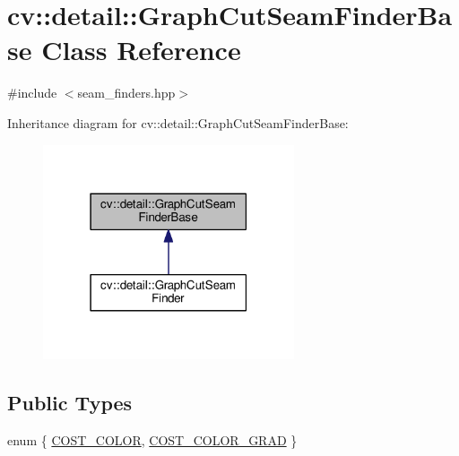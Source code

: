 \hypertarget{classcv_1_1detail_1_1GraphCutSeamFinderBase}{\section{cv\-:\-:detail\-:\-:Graph\-Cut\-Seam\-Finder\-Base Class Reference}
\label{classcv_1_1detail_1_1GraphCutSeamFinderBase}
}


{\ttfamily \#include $<$seam\-\_\-finders.\-hpp$>$}



Inheritance diagram for cv\-:\-:detail\-:\-:Graph\-Cut\-Seam\-Finder\-Base\-:\nopagebreak
\begin{figure}[H]
\begin{center}
\leavevmode
\includegraphics[width=210pt]{classcv_1_1detail_1_1GraphCutSeamFinderBase__inherit__graph}
\end{center}
\end{figure}
\subsection*{Public Types}
\begin{DoxyCompactItemize}
\item 
enum \{ \hyperlink{classcv_1_1detail_1_1GraphCutSeamFinderBase_a322bf4a47a9cc71cfdd8ff65971f07c3afe0d275582723d93a0c576584ea90091}{C\-O\-S\-T\-\_\-\-C\-O\-L\-O\-R}, 
\hyperlink{classcv_1_1detail_1_1GraphCutSeamFinderBase_a322bf4a47a9cc71cfdd8ff65971f07c3a4e0af02eed7c3f02976244dc832e0e81}{C\-O\-S\-T\-\_\-\-C\-O\-L\-O\-R\-\_\-\-G\-R\-A\-D}
 \}
\end{DoxyCompactItemize}


